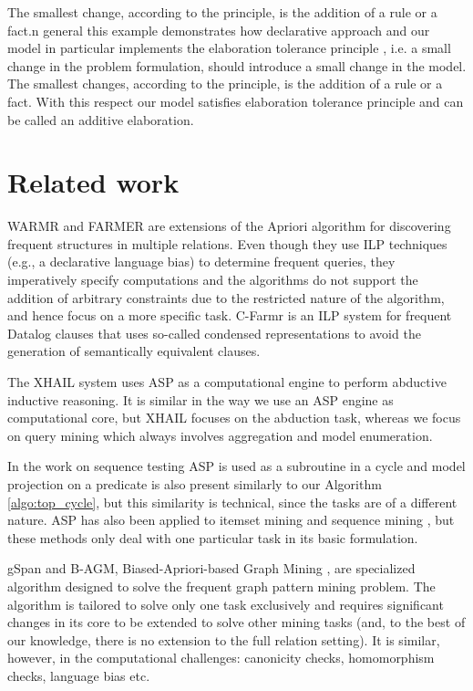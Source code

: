 The smallest change, according to the principle, is the addition of a rule or a fact.n general this example demonstrates how declarative approach and our model in particular implements the elaboration tolerance principle \parencite{elaboration_tolerance}, i.e. a small change in the problem formulation, should introduce a small change in the model. The smallest changes, according to the principle, is the addition of a rule or a fact. With this respect our model satisfies elaboration tolerance principle and can be called an additive elaboration.
\section{Related work} \label{sec:related_work}
WARMR \parencite{warmr} and FARMER \parencite{farmer} are extensions of the Apriori algorithm for discovering frequent structures in multiple relations. Even though they use ILP techniques (e.g., a declarative language bias) to determine frequent queries, they imperatively specify computations and the algorithms do not support the addition of arbitrary constraints due to the restricted nature of the algorithm, and hence focus on a more specific task. C-Farmr \parencite{condensed_luc} is an ILP system for frequent Datalog clauses that uses so-called condensed representations to avoid the generation of semantically equivalent clauses. %

The XHAIL system \parencite{xhail} uses ASP as a computational engine to perform abductive inductive reasoning. It is similar in the way we use an ASP engine as computational core, but XHAIL focuses on the abduction task, whereas we focus on query mining which always involves aggregation and model enumeration.

In the work on sequence testing \parencite{asp_sequence_testing} ASP is used as a subroutine in a cycle and model projection on a predicate is also present similarly to our Algorithm \ref{algo:top_cycle}, but this similarity is technical, since the tasks are of a different nature. ASP has also been applied to itemset mining \parencite{asp_itemset} and sequence mining \parencite{seq_asp}, but these methods only deal with one particular task in its basic formulation. 

gSpan \parencite{gspan} and B-AGM, Biased-Apriori-based Graph Mining \parencite{bagm}, are specialized algorithm designed to solve the frequent graph pattern mining problem. The algorithm is tailored to solve only one task exclusively and requires significant changes in its core to be extended to solve other mining tasks (and, to the best of our knowledge, there is no extension to the full relation setting). It is similar, however, in the computational challenges: canonicity checks, homomorphism checks, language bias etc. 
